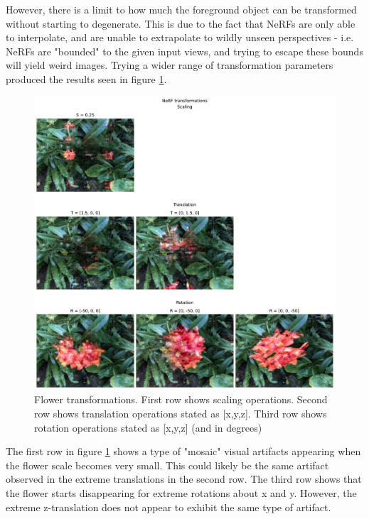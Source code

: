 However, there is a limit to how much the foreground object can be transformed without starting to degenerate. This is due to the fact that NeRFs are only able to interpolate, and are unable to extrapolate to wildly unseen perspectives - i.e. NeRFs are "bounded" to the given input views, and trying to escape these bounds will yield weird images. Trying a wider range of transformation parameters produced the results seen in figure \ref{fig:3_4-flower-transformations-failed}.
\begin{figure}[H]
    \centering
    \includegraphics[width=1.0\textwidth]{figures/3_4-flower-transformations-failed.pdf}
    \caption{Flower transformations. First row shows scaling operations. Second row shows translation operations stated as [x,y,z]. Third row shows rotation operations stated as [x,y,z] (and in degrees)}
    \label{fig:3_4-flower-transformations-failed}
\end{figure}
The first row in figure \ref{fig:3_4-flower-transformations-failed} shows a type of "mosaic" visual artifacts appearing when the flower scale becomes very small. This could likely be the same artifact observed in the extreme translations in the second row. The third row shows that the flower starts disappearing for extreme rotations about x and y. However, the extreme z-translation does not appear to exhibit the same type of artifact.

